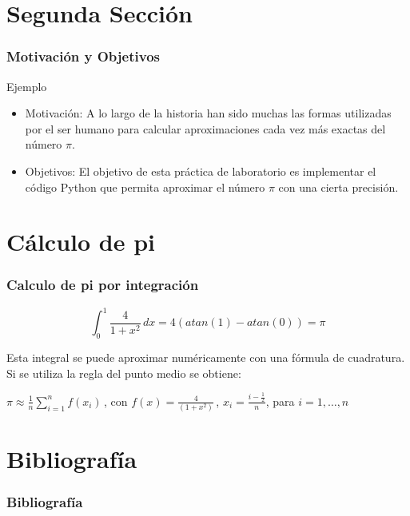 \documentclass{beamer}
\begin{document}
\section{Segunda Sección}

\begin{frame}

\frametitle{Motivación y Objetivos}

\begin{block}{Ejemplo}
  \begin{itemize}
  \item
  Motivación: A lo largo de la historia han sido muchas las formas utilizadas por el
ser humano para calcular aproximaciones cada vez más exactas del número $\pi$.
\cite{URL:HTTP}
  \pause

  \item
  Objetivos: El objetivo de esta práctica de laboratorio es implementar el código \textsf{Python}
que permita a\-pro\-xi\-mar el número $\pi$ con una cierta precisión.
  \pause

  \end{itemize}
\end{block}

\end{frame}

\section{Cálculo de pi}
\begin{frame}
\frametitle{Calculo de pi por integración}

$$\int_{0}^{1} \! \frac{4}{1+x^2}\, dx = 4(atan(1) -atan(0)) = \pi $$

Esta integral se puede aproximar numéricamente con una fórmula de cuadratura.
%
Si se utiliza la regla del punto medio se obtiene:

$ \pi \approx \frac{1}{n} \sum\limits_{i=1}^{n}f(x_i)\,$,
con $f(x) = \frac{4}{(1+x^2)}\,$,
$x_i = \frac{i - \frac{1}{2}}{n}$,
para $i = 1, \dots, n$
\end{frame}



\section{Bibliografía}
\begin{frame}
  \frametitle{Bibliografía}

  


  
  \nocite{*}
\end{frame}

\end{document}
